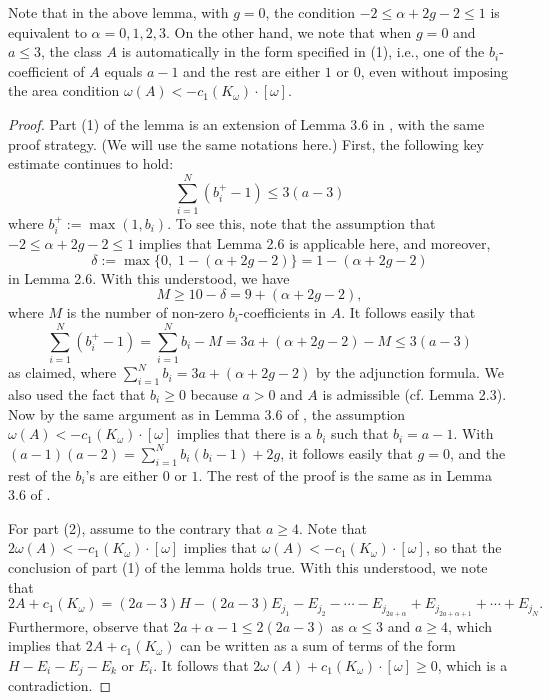 \documentclass[11pt]{amsart}
\theoremstyle{plain}
\numberwithin{theorem}{section}
\theoremstyle{definition}
\begin{document}
Note that in the above lemma, with $g=0$, the condition $-2\leq \alpha+2g-2\leq 1$ is equivalent to  
$\alpha=0,1,2,3$. On the other hand, we note that when $g=0$ and $a\leq 3$, the class $A$ is automatically in the form specified in (1), i.e., one of the $b_i$-coefficient of $A$ equals $a-1$ and the rest are either $1$ or $0$, even without imposing the area condition $\omega(A)<-c_1(K_\omega)\cdot [\omega]$.

\begin{proof}
Part (1) of the lemma is an extension of Lemma 3.6 in \cite{C}, with the same proof strategy. (We will use the same notations here.) First, the following key estimate continues to hold:
$$
\sum_{i=1}^N(b^{+}_i-1)\leq 3(a-3)
$$ 
where $b^{+}_i:=\max (1,b_i)$. To see this, note that the assumption that 
$-2\leq \alpha+2g-2\leq 1$ implies that Lemma 2.6 is applicable here, and moreover, 
$$
\delta:=\max \{0, \; 1-(\alpha+2g-2)\}=1-(\alpha+2g-2)
$$ 
in Lemma 2.6. With this understood, we have 
$$
M\geq 10-\delta=9+(\alpha+2g-2),
$$
where $M$ is the number of non-zero $b_i$-coefficients in $A$. It follows easily that
$$
\sum_{i=1}^N(b^{+}_i-1)=\sum_{i=1}^N b_i-M=3a+(\alpha+2g-2)-M\leq 3(a-3)
$$
as claimed, where $\sum_{i=1}^N b_i=3a+(\alpha+2g-2)$ by the adjunction formula. We also used the fact that
$b_i\geq 0$ because $a>0$ and $A$ is admissible (cf. Lemma 2.3). 
Now by the same argument as in Lemma 3.6 of \cite{C}, the assumption
$\omega(A)<-c_1(K_\omega)\cdot [\omega]$ implies that there is a $b_i$ such that $b_i=a-1$.
With $(a-1)(a-2)=\sum_{i=1}^N b_i(b_i-1)+2g$, it follows easily that $g=0$, and the rest of the 
$b_i$'s are either $0$ or $1$. The rest of the proof is the same as in Lemma 3.6 of \cite{C}.

For part (2), assume to the contrary that $a\geq 4$. Note that $2\omega(A)<-c_1(K_\omega)\cdot [\omega]$ implies that $\omega(A)<-c_1(K_\omega)\cdot [\omega]$, so that the conclusion of part
(1) of the lemma holds true. With this understood, we note that
$$
2A+c_1(K_\omega)=(2a-3)H-(2a-3)E_{j_1}-E_{j_2}-\cdots- E_{j_{2a+\alpha}}+E_{j_{2a+\alpha+1}}+\cdots+E_{j_N}.
$$
Furthermore, observe that $2a+\alpha-1\leq 2(2a-3)$ as $\alpha\leq 3$ and $a\geq 4$,
which implies that $2A+c_1(K_\omega)$ can be written as a sum of terms of the form 
$H-E_i-E_j-E_k$ or $E_i$. It follows that $2\omega(A)+c_1(K_\omega)\cdot [\omega]\geq 0$,
which is a contradiction.

\end{proof}

\end{document}
